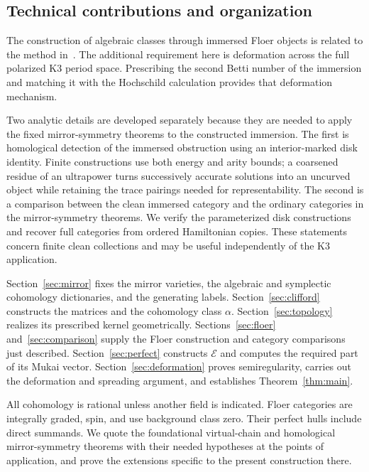 \documentclass[11pt]{article}
\numberwithin{equation}{section}
\theoremstyle{definition}
\theoremstyle{remark}
\begin{document}
\subsection{Technical contributions and organization}

The construction of algebraic classes through immersed Floer
objects is related to the method in~\cite{W}.  The additional
requirement here is deformation across the full polarized K3
period space.  Prescribing the second Betti number of the
immersion and matching it with the Hochschild calculation
provides that deformation mechanism.

Two analytic details are developed separately because they are
needed to apply the fixed mirror-symmetry theorems to the
constructed immersion.  The first is homological detection of
the immersed obstruction using an interior-marked disk identity.
Finite constructions use both energy and arity bounds; a
coarsened residue of an ultrapower turns successively accurate
solutions into an uncurved object while retaining the trace
pairings needed for representability.  The second is a
comparison between the clean immersed category and the ordinary
categories in the mirror-symmetry theorems.  We verify the
parameterized disk constructions and recover full categories
from ordered Hamiltonian copies.  These statements concern
finite clean collections and may be useful independently of the
K3 application.

Section~\ref{sec:mirror} fixes the mirror varieties, the algebraic
and symplectic cohomology dictionaries, and the generating labels.
Section~\ref{sec:clifford} constructs the matrices and the
cohomology class $\alpha$.  Section~\ref{sec:topology} realizes
its prescribed kernel geometrically.
Sections~\ref{sec:floer} and~\ref{sec:comparison} supply the
Floer construction and category comparisons just described.
Section~\ref{sec:perfect} constructs $\mathcal E$ and computes
the required part of its Mukai vector.
Section~\ref{sec:deformation} proves semiregularity, carries out
the deformation and spreading argument, and establishes
Theorem~\ref{thm:main}.

All cohomology is rational unless another field is indicated.
Floer categories are integrally graded, spin, and use background
class zero.  Their perfect hulls include direct summands.  We
quote the foundational virtual-chain and homological
mirror-symmetry theorems with their needed hypotheses at the
points of application, and prove the extensions specific to the
present construction there.
\end{document}
